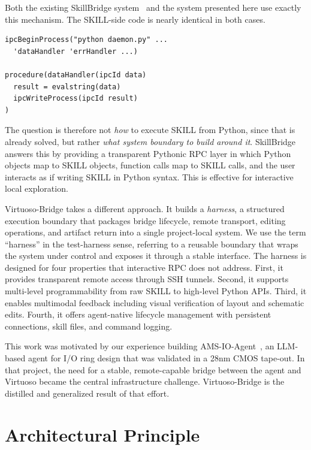 \documentclass[lettersize,journal]{ieee_template/IEEEtran}
\begin{document}
Both the existing SkillBridge system~\cite{skillbridge} and the system presented here use exactly this mechanism. The SKILL-side code is nearly identical in both cases.

\begin{verbatim}
ipcBeginProcess("python daemon.py" ...
  'dataHandler 'errHandler ...)

procedure(dataHandler(ipcId data)
  result = evalstring(data)
  ipcWriteProcess(ipcId result)
)
\end{verbatim}

The question is therefore not \emph{how} to execute SKILL from Python, since that is already solved, but rather \emph{what system boundary to build around it}. SkillBridge answers this by providing a transparent Pythonic RPC layer in which Python objects map to SKILL objects, function calls map to SKILL calls, and the user interacts as if writing SKILL in Python syntax. This is effective for interactive local exploration.

Virtuoso-Bridge takes a different approach. It builds a \emph{harness}, a structured execution boundary that packages bridge lifecycle, remote transport, editing operations, and artifact return into a single project-local system. We use the term ``harness'' in the test-harness sense, referring to a reusable boundary that wraps the system under control and exposes it through a stable interface. The harness is designed for four properties that interactive RPC does not address. First, it provides transparent remote access through SSH tunnels. Second, it supports multi-level programmability from raw SKILL to high-level Python APIs. Third, it enables multimodal feedback including visual verification of layout and schematic edits. Fourth, it offers agent-native lifecycle management with persistent connections, skill files, and command logging.

This work was motivated by our experience building AMS-IO-Agent~\cite{amsioagent}, an LLM-based agent for I/O ring design that was validated in a 28nm CMOS tape-out. In that project, the need for a stable, remote-capable bridge between the agent and Virtuoso became the central infrastructure challenge. Virtuoso-Bridge is the distilled and generalized result of that effort.

\section{Architectural Principle}
\end{document}
